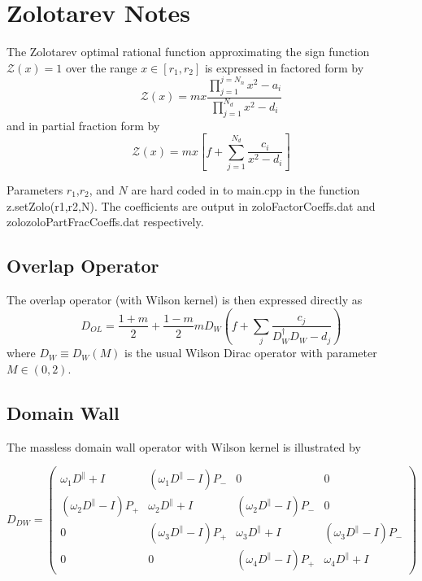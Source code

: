 \documentclass[11pt]{article}
\begin{document}
\section{Zolotarev Notes}

The Zolotarev optimal rational function approximating the sign function $\mathcal{Z}(x)=1$ over the range $x\in[r_1,r_2]$ is expressed in factored form by
\begin{equation}
\mathcal{Z}(x)=mx\frac{\prod_{j=1}^{j=N_n}x^2-a_i}{\prod_{j=1}^{N_d}x^2-d_i} 
\end{equation}
and in partial fraction form by
\begin{equation}
\mathcal{Z}(x)=mx[f+\sum_{j=1}^{N_d}\frac{c_i}{x^2-d_i}]
\end{equation}

Parameters $r_1$,$r_2$, and $N$ are hard coded in to main.cpp in the function z.setZolo(r1,r2,N). The coefficients are output in zoloFactorCoeffs.dat and zolozoloPartFracCoeffs.dat respectively.

\subsection{Overlap Operator}

The overlap operator (with Wilson kernel) is then expressed directly as
\begin{equation}
D_{OL}=\frac{1+m}{2}+\frac{1-m}{2}mD_W( f+ \sum_j \frac{c_j} {D_W^\dagger D_W-d_j})
\end{equation}
where $D_W\equiv D_W(M)$ is the usual Wilson Dirac operator with parameter $M\in(0,2)$.

\subsection{Domain Wall}

The massless domain wall operator with Wilson kernel is illustrated by

\begin{equation}
D_{DW} = 
\begin{pmatrix}
 \omega_1 D^\parallel+I & (\omega_1 D^\parallel-I)P_- & 0 & 0 \\
 (\omega_2 D^\parallel-I)P_+ & \omega_2 D^\parallel+I & (\omega_2 D^\parallel-I)P_- & 0 \\
 0 & (\omega_3 D^\parallel-I)P_+ & \omega_3 D^\parallel+I & (\omega_3 D^\parallel-I)P_- \\
 0 & 0 & (\omega_4 D^\parallel-I)P_+ & \omega_4 D^\parallel+I 
\end{pmatrix}
\end{equation}
\end{document}
